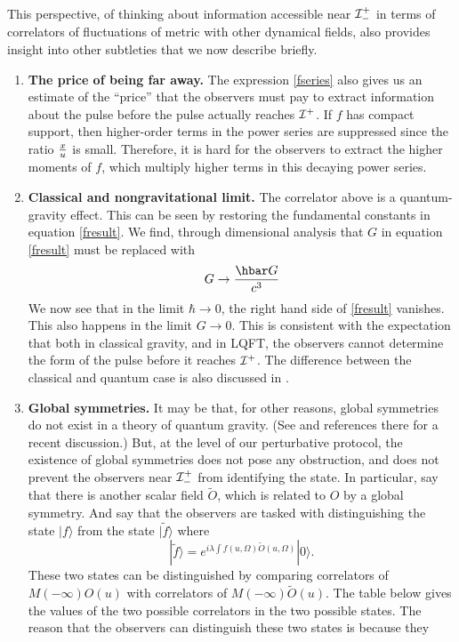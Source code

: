 \documentclass[12pt]{article}
\def\gnewt{G}
\newcommand{\be}{\begin{equation}}
\newcommand{\ee}{\end{equation}}
\def \scrip{{\cal I}^{+}}
\def \scrippast{{\cal I}^{+}_{-}}
\begin{document}
This perspective, of thinking about information accessible near $\scrippast$ in terms of correlators of fluctuations
of metric with other dynamical fields, also provides insight into other subtleties that we now describe briefly.
\begin{enumerate}
\item
{\bf The price of being far away.} 
The expression \eqref{fseries} also gives us an estimate of the ``price'' that the observers must pay to extract information about the pulse before the pulse actually reaches $\scrip$. If $f$ has compact support, then  higher-order terms in the power series are suppressed since the ratio ${x \over u}$ is small. Therefore, it is hard for the observers to extract the higher moments of $f$, which multiply higher terms in this decaying power series. 
\item
{\bf Classical and nongravitational limit.} The correlator above is a quantum-gravity effect. This can be seen by restoring the fundamental constants in equation \eqref{fresult}. We find, through dimensional analysis that $\gnewt$ in equation \eqref{fresult} must be replaced with
\be
\gnewt \rightarrow {\hbar \gnewt \over c^3}
\ee
We now see that in the limit $\hbar \rightarrow 0$, the right hand side of \eqref{fresult} vanishes. This also happens in the limit $\gnewt \rightarrow 0$. This is consistent with the expectation that both in classical gravity, and in LQFT,  the observers cannot determine the form of the pulse before it reaches $\scrip$. The difference between the classical and quantum case is also discussed in \cite{Jacobson:2019gnm}.
\item
{\bf Global symmetries.} It may be that, for other reasons, global symmetries do not exist in a theory of quantum gravity. (See \cite{Harlow:2018tng} and references there for a recent discussion.) But, at the level of our perturbative protocol, the existence of global symmetries does not pose any obstruction, and does not prevent the observers near $\scrippast$ from identifying the state. In particular, say that there is another scalar field $\widetilde{O}$, which is related to $O$ by a global symmetry. And say that the observers are tasked with distinguishing the state $|f \rangle$ from the state $|\widetilde{f} \rangle$ where
\be
\label{ftildedef}
|\widetilde{f} \rangle = e^{i \lambda \int f(u, \Omega) \widetilde{O}(u, \Omega)} |0 \rangle.
\ee
These two states can be distinguished by comparing correlators of $M(-\infty) O(u)$ with correlators of $M(-\infty) \widetilde{O}(u)$. The table below gives the values of the two possible correlators in the two possible states. The reason that the observers can distinguish these two states is because they

\end{enumerate}
\end{document}
